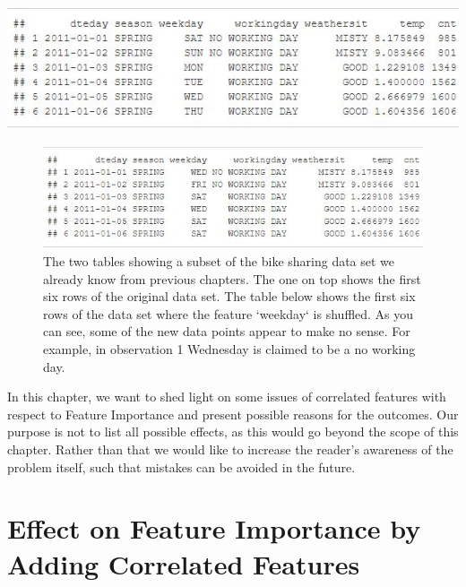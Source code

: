 \documentclass[
]{krantz}
\begin{document}
\begin{center}\includegraphics[width=0.75\linewidth]{images/realPFI01} \end{center}

\begin{figure}

{\centering \includegraphics[width=0.75\linewidth]{images/realPFI02} 

}

\caption{The two tables showing a subset of the bike sharing data set we already know from previous chapters. The one on top shows the first six rows of the original data set. The table below shows the first six rows of the data set where the feature `weekday` is shuffled. As you can see, some of the new data points appear to make no sense. For example, in observation 1 Wednesday is claimed to be a no working day.}\label{fig:realPFI02}
\end{figure}

In this chapter, we want to shed light on some issues of correlated features with respect to Feature Importance and present possible reasons for the outcomes. Our purpose is not to list all possible effects, as this would go beyond the scope of this chapter. Rather than that we would like to increase the reader's awareness of the problem itself, such that mistakes can be avoided in the future.

\hypertarget{effect-on-feature-importance-by-adding-correlated-features}{%
\section{Effect on Feature Importance by Adding Correlated Features}\label{effect-on-feature-importance-by-adding-correlated-features}}
\end{document}

